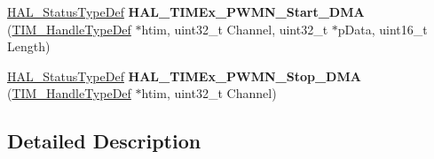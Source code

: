 \begin{DoxyCompactItemize}
\item 
\mbox{\label{group___t_i_m_ex___exported___functions___group3_gac525533dc108ee4915ca93d5a43cb3b5}} 
\hyperlink{stm32f0xx__hal__def_8h_a63c0679d1cb8b8c684fbb0632743478f}{H\+A\+L\+\_\+\+Status\+Type\+Def} {\bfseries H\+A\+L\+\_\+\+T\+I\+M\+Ex\+\_\+\+P\+W\+M\+N\+\_\+\+Start\+\_\+\+D\+MA} (\hyperlink{struct_t_i_m___handle_type_def}{T\+I\+M\+\_\+\+Handle\+Type\+Def} $\ast$htim, uint32\+\_\+t Channel, uint32\+\_\+t $\ast$p\+Data, uint16\+\_\+t Length)
\item 
\mbox{\label{group___t_i_m_ex___exported___functions___group3_ga10afdfdc5eed2e0288ccb969f48bc0e4}} 
\hyperlink{stm32f0xx__hal__def_8h_a63c0679d1cb8b8c684fbb0632743478f}{H\+A\+L\+\_\+\+Status\+Type\+Def} {\bfseries H\+A\+L\+\_\+\+T\+I\+M\+Ex\+\_\+\+P\+W\+M\+N\+\_\+\+Stop\+\_\+\+D\+MA} (\hyperlink{struct_t_i_m___handle_type_def}{T\+I\+M\+\_\+\+Handle\+Type\+Def} $\ast$htim, uint32\+\_\+t Channel)
\end{DoxyCompactItemize}


\subsection{Detailed Description}
